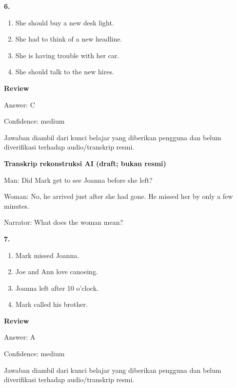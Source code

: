 \documentclass[12pt]{article}
\begin{document}
\noindent\textbf{6.}
\begin{enumerate}[label=(\Alph*),leftmargin=*,itemsep=0.2em]
\item She should buy a new desk light.
\item She had to think of a new headline.
\item She is having trouble with her car.
\item She should talk to the new hires.
\end{enumerate}
\par
\begingroup
\setlength{\parskip}{0pt}
\setlength{\parindent}{0pt}
\textbf{Review}\par
Answer: C\par
Confidence: medium\par
Jawaban diambil dari kunci belajar yang diberikan pengguna dan belum diverifikasi terhadap audio/transkrip resmi.\par
\endgroup
\par
\vspace{0.25\baselineskip}
\begin{exampleblock}
\textbf{Transkrip rekonstruksi AI (draft; bukan resmi)}\par
Man: Did Mark get to see Joanna before she left?\par
Woman: No, he arrived just after she had gone. He missed her by only a few minutes.\par
Narrator: What does the woman mean?\par
\end{exampleblock}
\noindent\textbf{7.}
\begin{enumerate}[label=(\Alph*),leftmargin=*,itemsep=0.2em]
\item Mark missed Joanna.
\item Joe and Ann love canoeing.
\item Joanna left after 10 o'clock.
\item Mark called his brother.
\end{enumerate}
\par
\begingroup
\setlength{\parskip}{0pt}
\setlength{\parindent}{0pt}
\textbf{Review}\par
Answer: A\par
Confidence: medium\par
Jawaban diambil dari kunci belajar yang diberikan pengguna dan belum diverifikasi terhadap audio/transkrip resmi.\par
\endgroup
\par
\vspace{0.25\baselineskip}
\end{document}
